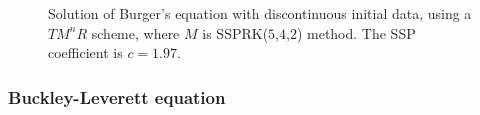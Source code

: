 \begin{figure}[t!]
    \centering
    \caption{Solution of Burger's equation with discontinuous initial data, using a $ TM^{n}R $ scheme, where $ M $ is SSPRK($ 5 $,$ 4 $,$ 2 $) method. The SSP coefficient is $ c = 1.97 $.}
    \label{fig5.4}
\end{figure}

\subsubsection{Buckley-Leverett equation}\label{subsubsec:B-L}
